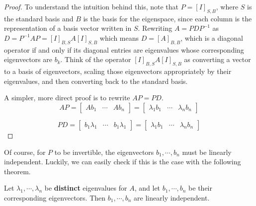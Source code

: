 \begin{proof}

To understand the intuition behind this, note that $P = [I]_{S, B}$, where $S$ is the standard basis and $B$ is the basis for the eigenspace, since each column is the representation of a basis vector written in $S$. Rewriting $A = PDP^{-1}$ as $D = P^{-1}AP = [I]_{B, S} A [I]_{S,B}$ which means $D = [A]_{B, B}$, which is a diagonal operator if and only if its diagonal entries are eigenvalues whose corresponding eigenvectors are $b_{k}$. Think of the operator $[I]_{B, S} A [I]_{S,B}$ as converting a vector to a basis of eigenvectors, scaling those eigenvectors appropriately by their eigenvalues, and then converting back to the standard basis. 

A simpler, more direct proof is to rewrite $AP = PD$. 
$$AP = \begin{bmatrix}
Ab_{1} & \cdots & Ab_{n}
\end{bmatrix} = \begin{bmatrix}
\lambda_{1} b_{1} & \cdots & \lambda_{n} b_{n}
\end{bmatrix}$$

$$PD = \begin{bmatrix}
b_{1} \lambda_{1} & \cdots & b_{1} \lambda_{1}
\end{bmatrix} = \begin{bmatrix}
\lambda_{1} b_{1} & \cdots & \lambda_{n} b_{n}
\end{bmatrix}$$
\end{proof}

Of course, for $P$ to be invertible, the eigenvectors $b_{1}, \cdots, b_{n}$ must be linearly independent. Luckily, we can easily check if this is the case with the following theorem. 

\begin{theorem}
Let $\lambda_{1}, \cdots, \lambda_{n}$ be \textbf{distinct} eigenvalues for $A$, and let $b_{1}, \cdots, b_{n}$ be their corresponding eigenvectors. Then $b_{1}, \cdots, b_{n}$ are linearly independent. 
\end{theorem}

